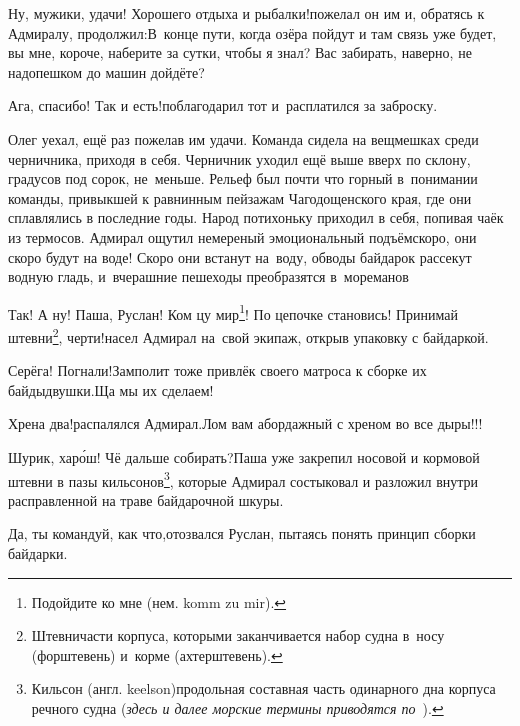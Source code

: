\diagdash Ну, мужики, удачи! Хорошего отдыха и рыбалки!\mdash пожелал он им и, обратясь к Адмиралу, продолжил:\mdash В~конце пути, когда озёра пойдут и там связь уже будет, вы мне, короче, наберите за сутки, чтобы я знал? Вас забирать, наверно, не надо\mdash пешком до машин дойдёте?

\diagdash Ага, спасибо! Так и есть!\mdash поблагодарил тот и~расплатился за заброску.

Олег уехал, ещё раз пожелав им удачи. Команда сидела на вещмешках среди черничника, приходя в себя. Черничник уходил ещё выше вверх по склону, градусов под сорок, не~меньше. Рельеф был почти что горный в~понимании команды, привыкшей к равнинным пейзажам Чагодощенского края, где они сплавлялись в последние годы. Народ потихоньку приходил в себя, попивая чаёк из термосов. Адмирал ощутил немереный эмоциональный подъём\mdash скоро, они скоро будут на воде! Скоро они встанут на~воду, обводы байдарок рассекут водную гладь, и~вчерашние пешеходы преобразятся в~мореманов\myldots{} 


\renewcommand*{\thefootnote}{\arabic{footnote}}
\setcounter{footnote}{0}
\diagdash Так! А ну! Паша, Руслан! Ком цу мир\footnote{Подойдите ко мне (нем. komm zu mir).}! По цепочке становись! Принимай штевни\footnote{Штевни\mdash части корпуса, которыми заканчивается набор судна в~носу (форштевень) и~корме (ахтерштевень).}, черти!\mdash насел Адмирал на~свой экипаж, открыв упаковку с байдаркой.

\diagdash Серёга! Погнали!\mdash Замполит тоже привлёк своего матроса к сборке их байды\sdash двушки.\mdash Ща мы их сделаем!

\diagdash Хрена два!\mdash распалялся Адмирал.\mdash Лом вам абордажный с хреном во все дыры!!! 

\renewcommand*{\thefootnote}{\arabic{footnote}}
\setcounter{footnote}{0}
\diagdash Шурик, хар\'{о}ш! Чё дальше собирать?\mdash Паша уже закрепил носовой и кормовой штевни в пазы кильсонов\footnote{Кильсон (англ. keelson)\mdash продольная составная часть одинарного дна корпуса речного судна (\textit{здесь и далее морские термины приводятся по}~\cite{МорскойСправочник}).}, которые Адмирал состыковал и разложил внутри расправленной на траве байдарочной шкуры.

\diagdash Да, ты командуй, как что,\mdash отозвался Руслан, пытаясь понять принцип сборки байдарки.

